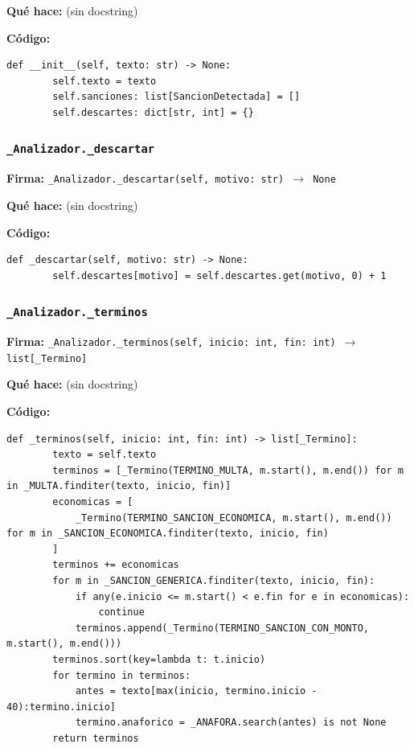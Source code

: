 \documentclass[11pt,a4paper]{article}
\begin{document}
\textbf{Qué hace:} (sin docstring)

\textbf{Código:}
\begin{lstlisting}
def __init__(self, texto: str) -> None:
        self.texto = texto
        self.sanciones: list[SancionDetectada] = []
        self.descartes: dict[str, int] = {}
\end{lstlisting}

\subsubsection*{\texttt{\_Analizador.\_descartar}}
\textbf{Firma:} \texttt{\_Analizador.\_descartar(self, motivo: str) $\rightarrow$ None}

\textbf{Qué hace:} (sin docstring)

\textbf{Código:}
\begin{lstlisting}
def _descartar(self, motivo: str) -> None:
        self.descartes[motivo] = self.descartes.get(motivo, 0) + 1
\end{lstlisting}

\subsubsection*{\texttt{\_Analizador.\_terminos}}
\textbf{Firma:} \texttt{\_Analizador.\_terminos(self, inicio: int, fin: int) $\rightarrow$ list[\_Termino]}

\textbf{Qué hace:} (sin docstring)

\textbf{Código:}
\begin{lstlisting}
def _terminos(self, inicio: int, fin: int) -> list[_Termino]:
        texto = self.texto
        terminos = [_Termino(TERMINO_MULTA, m.start(), m.end()) for m in _MULTA.finditer(texto, inicio, fin)]
        economicas = [
            _Termino(TERMINO_SANCION_ECONOMICA, m.start(), m.end()) for m in _SANCION_ECONOMICA.finditer(texto, inicio, fin)
        ]
        terminos += economicas
        for m in _SANCION_GENERICA.finditer(texto, inicio, fin):
            if any(e.inicio <= m.start() < e.fin for e in economicas):
                continue
            terminos.append(_Termino(TERMINO_SANCION_CON_MONTO, m.start(), m.end()))
        terminos.sort(key=lambda t: t.inicio)
        for termino in terminos:
            antes = texto[max(inicio, termino.inicio - 40):termino.inicio]
            termino.anaforico = _ANAFORA.search(antes) is not None
        return terminos
\end{lstlisting}
\end{document}
